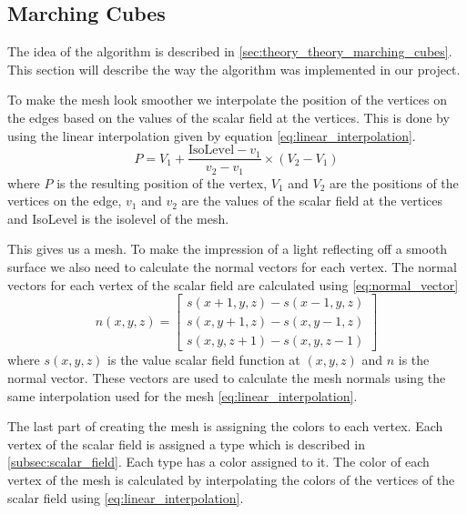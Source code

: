 \subsection{Marching Cubes} \label{subsec:marching_cubes}
The idea of the algorithm is described in \autoref{sec:theory_theory_marching_cubes}.
This section will describe the way the algorithm was implemented in our project.

To make the mesh look smoother we interpolate the position of the vertices on the edges based on the values of the scalar field at the vertices.
This is done by using the linear interpolation given by equation \autoref{eq:linear_interpolation}.
\begin{equation}
  \label{eq:linear_interpolation}
  P = V_1 + \frac{\text{IsoLevel} - v_1}{v_2 - v_1} \times (V_2 - V_1)
\end{equation}
where $P$ is the resulting position of the vertex, $V_1$ and $V_2$ are the positions of the vertices on the edge, $v_1$ and $v_2$ are the values of the scalar field at the vertices and IsoLevel is the isolevel of the mesh.
  
This gives us a mesh.
To make the impression of a light reflecting off a smooth surface we also need to calculate the normal vectors for each vertex.
The normal vectors for each vertex of the scalar field are calculated using \autoref{eq:normal_vector}
\begin{equation}
    \label{eq:normal_vector}
    n(x, y, z) = \begin{bmatrix}
        s(x + 1, y, z) - s(x - 1, y, z) \\
        s(x, y + 1, z) - s(x, y - 1, z) \\
        s(x, y, z + 1) - s(x, y, z - 1)
      \end{bmatrix}
\end{equation}
where $s(x, y, z)$ is the value scalar field function at $(x,y,z)$ and $n$ is the normal vector.
These vectors are used to calculate the mesh normals using the same interpolation used for the mesh \autoref{eq:linear_interpolation}.

The last part of creating the mesh is assigning the colors to each vertex.
Each vertex of the scalar field is assigned a type which is described in \autoref{subsec:scalar_field}.
Each type has a color assigned to it.
The color of each vertex of the mesh is calculated by interpolating the colors of the vertices of the scalar field using \autoref{eq:linear_interpolation}.

